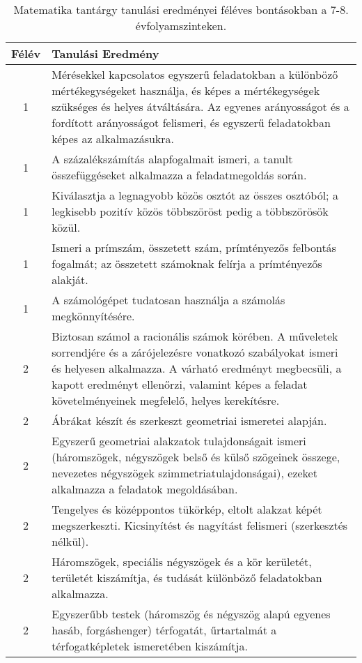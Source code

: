        
           \begin{longtable}{c | p{} }
            \caption[Matematika 7-8.]{Matematika tantárgy tanulási eredményei féléves bontásokban a 7-8. évfolyamszinteken. }  \\

            \textbf{Félév} & \textbf{Tanulási Eredmény} \\
            \hline
            \endhead
                                
                                          1 &  Mérésekkel kapcsolatos egyszerű feladatokban a különböző mértékegységeket használja, és képes a mértékegységek szükséges és helyes átváltására. Az egyenes arányosságot és a fordított arányosságot felismeri, és egyszerű feladatokban képes az alkalmazásukra.
 \\ \hline
                                          1 &  A százalékszámítás alapfogalmait ismeri, a tanult összefüggéseket alkalmazza a  feladatmegoldás során. \\ \hline
                                          1 &  Kiválasztja a legnagyobb közös osztót az összes osztóból; a legkisebb pozitív közös többszöröst pedig a többszörösök közül. \\ \hline
                                          1 &  Ismeri a prímszám, összetett szám, prímtényezős felbontás fogalmát; az összetett számoknak felírja a prímtényezős alakját. \\ \hline
                                          1 &  A számológépet tudatosan használja a számolás megkönnyítésére. \\ \hline
                                      
                                
                                          2 &  Biztosan számol a racionális számok körében. A műveletek sorrendjére és a zárójelezésre vonatkozó szabályokat ismeri és helyesen alkalmazza. A várható eredményt megbecsüli, a kapott  eredményt ellenőrzi, valamint képes a feladat követelményeinek megfelelő, helyes kerekítésre. \\ \hline
                                          2 &  Ábrákat készít és szerkeszt geometriai ismeretei alapján. \\ \hline
                                          2 &  Egyszerű geometriai alakzatok tulajdonságait ismeri (háromszögek, négyszögek belső és külső szögeinek összege, nevezetes négyszögek szimmetriatulajdonságai), ezeket alkalmazza a feladatok megoldásában. \\ \hline
                                          2 &  Tengelyes és középpontos tükörkép, eltolt alakzat képét megszerkeszti. Kicsinyítést és nagyítást felismeri (szerkesztés nélkül). \\ \hline
                                          2 &  Háromszögek, speciális négyszögek és a kör kerületét, területét kiszámítja, és tudását különböző feladatokban alkalmazza. \\ \hline
                                          2 &  Egyszerűbb testek (háromszög és négyszög alapú egyenes hasáb, forgáshenger) térfogatát, űrtartalmát a térfogatképletek ismeretében kiszámítja. \\ \hline
                                      

\end{longtable}
